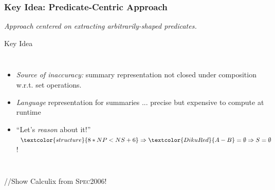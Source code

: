 \documentclass{beamer}
\renewcommand{\emph}[1]{\textcolor{structure}{#1}}
\newcommand{\emp}[1]{\textcolor{DikuRed}{ #1}}
\begin{document}
\begin{frame}[fragile,t]
  \frametitle{Key Idea: Predicate-Centric Approach}

\smallskip

{\em Approach centered on extracting arbitrarily-shaped predicates.} 

\bigskip

\begin{block}{Key Idea} 
\begin{columns} 
 \vspace{-2ex}
\begin{itemize}
    \item \emp{{\em Source of inaccuracy:}} summary representation not closed under composition w.r.t. set operations. \bigskip
    \item \emph{{\em Language}} representation for summaries ... precise but \emp{expensive} to compute at runtime \bigskip
    \item ``Let's \emph{{\em reason}} about it!'' $\emph{8*NP < NS + 6} \Rightarrow \emp{A - B} = \emptyset \Rightarrow S=\emptyset$!
\end{itemize}
\hspace{-2ex}\includegraphics[height=30ex]{Figures/L5-LoopPar/USR_HE_FIND_SOLVH}
\end{columns}
\end{block}

//\alert{Show Calculix from \textsc{Spec2006}}!

\end{frame}
\end{document}
